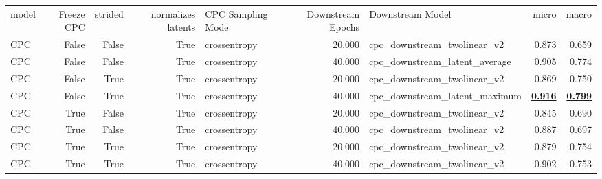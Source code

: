 \begin{adjustbox}{width=\textwidth}
\begin{tabular}{lrrrlrlrr}
{model} & {Freeze CPC} & {strided} & {normalizes latents} & {CPC Sampling Mode} & {Downstream Epochs} & {Downstream Model} & {micro} & {macro} \\
CPC & False & False & True & crossentropy & 20.000 & cpc\_downstream\_twolinear\_v2 & 0.873 & 0.659 \\
CPC & False & False & True & crossentropy & 40.000 & cpc\_downstream\_latent\_average & 0.905 & 0.774 \\
CPC & False & True & True & crossentropy & 20.000 & cpc\_downstream\_twolinear\_v2 & 0.869 & 0.750 \\
CPC & False & True & True & crossentropy & 40.000 & cpc\_downstream\_latent\_maximum & \bfseries \underline{0.916} & \bfseries \underline{0.799} \\
CPC & True & False & True & crossentropy & 20.000 & cpc\_downstream\_twolinear\_v2 & 0.845 & 0.690 \\
CPC & True & False & True & crossentropy & 40.000 & cpc\_downstream\_twolinear\_v2 & 0.887 & 0.697 \\
CPC & True & True & True & crossentropy & 20.000 & cpc\_downstream\_twolinear\_v2 & 0.879 & 0.754 \\
CPC & True & True & True & crossentropy & 40.000 & cpc\_downstream\_twolinear\_v2 & 0.902 & 0.753 \\
\end{tabular}
\end{adjustbox}